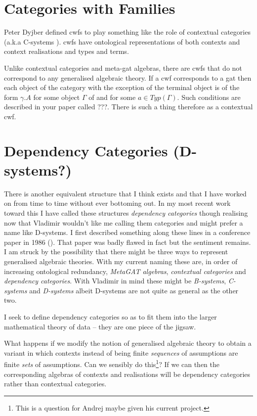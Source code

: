 \documentclass[10pt,a4paper]{article}
\theoremstyle{remark}
\begin{document}
\section{Categories with Families}
\note Peter Dyjber defined cwfs to play something like the role of contextual categories  (a.k.a C-systems ). cwfs have ontological representations of both contexts and context realisations and types and terms. 

Unlike contextual categories and meta-gat algebras, there are cwfs that do not correspond to
any generalised algebraic theory. If a cwf corresponds to a gat then each object of the category \catcw with the exception of the terminal object is of the form $\gamma.A$ for some object $\Gamma$ of \catcw and for some $a \in Typ(\Gamma)$. Such conditions are described in your paper called ???. There is such a thing therefore as a contextual cwf. 


\section{Dependency Categories (D-systems?)}

\note 
There is another equivalent structure that I think exists and that I have worked on from time to time without ever bottoming out. In my most recent work toward this I have called these
structures \textit{dependency categories} though realising now that Vladimir wouldn't like me calling them categories and might prefer a name like D-systems. I first described something along these lines in a conference paper in 1986 (\cite{Cartmell86B}). That paper was badly flawed in fact but the sentiment remains. 
\note
I am struck by the possibility that there might be three ways to represent generalised algebraic theories.
With my current naming these are, in order of increasing ontological redundancy, \textit{MetaGAT algebras}, \textit{contextual categories} and
\textit{dependency categories}. With Vladimir in mind these might be \textit{B-systems}, \textit{C-systems} and \textit{D-systems} albeit D-systems are not quite as general as the other two.


\note I seek to define dependency categories so as to fit them into the larger mathematical theory of data -- they are one piece of the jigsaw.

\note What happens if we modify the notion of generalised algebraic theory to obtain a variant in which contexts instead of being finite \textit{sequences} of assumptions are finite \textit{sets} of assumptions. Can we sensibly do this\footnote{This is a question for Andrej maybe given his current project.}? If we can then the corresponding algebras of contexts and realisations will be dependency categories rather than contextual categories.
\end{document}
